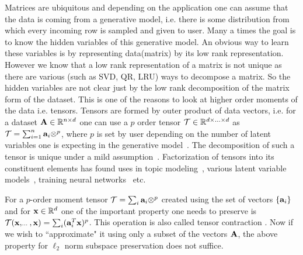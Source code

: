 Matrices are ubiquitous and depending on the application one can assume that the data is coming from a generative model, i.e. there is some distribution from which every incoming row is sampled and given to user. Many a times the goal is to know the hidden variables of this generative model. An obvious way to learn these variables is by representing data(matrix) by its low rank representation. However we know that a low rank representation of a matrix is not unique as there are various (such as SVD, QR, LRU) ways to decompose a matrix. So the hidden variables are not clear just by the low rank decomposition of the matrix form of the dataset.
This is one of the reasons to look at higher order moments of the data i.e. tensors. Tensors are formed by outer product of data vectors, i.e. for a dataset $\mathbf{A} \in \mathbb{R}^{n \times d}$ one can use a $p$ order tensor $\mathbf{\mathcal{T}} \in \mathbb{R}^{d \times \ldots \times d}$ as $\mathbf{\mathcal{T}} = \sum_{i=1}^{n} \mathbf{a}_{i} \otimes^{p}$, where $p$ is set by user depending on the number of latent variables one is expecting in the generative model~\cite{ma2016polynomial}. The decomposition of such a tensor is unique under a mild assumption~\cite{kruskal1977three}. 
Factorization of tensors into its constituent elements has found uses in topic modeling~\cite{anandkumar2014tensor}, various latent variable models~\cite{anandkumar2012method,hsu2012spectral,jenatton2012latent}, training neural networks~\cite{janzamin2015beating} etc. 

For a $p$-order moment tensor $\mathbf{\mathcal{T}} = \sum_i \mathbf{a}_{i}\otimes^p$ created using the set of vectors $\{\mathbf{a}_{i}\}$ and for $\mathbf{x} \in \mathbb{R}^{d}$ one of the important property one needs to preserve is $\mathbf{\mathcal{T}}(\mathbf{x}, _{\cdots}, \mathbf{x}) = \sum_{i} (\mathbf{a}_{i}^{T}\mathbf{x})^{p}$. This operation is also called tensor contraction \cite{song2016sublinear}. Now if we wish to ``approximate" it using only a subset of the vectors $\mathbf{A}$, the above property for $\ell_2$ norm subspace preservation does not suffice. %

